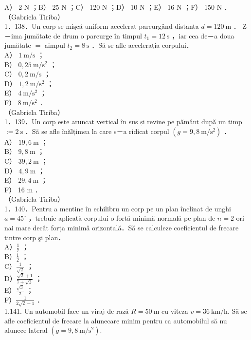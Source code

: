 \documentclass[10pt]{article}
\begin{document}
A） 2 N ；B） 25 N ；C） 120 N ；D） 10 N ；E） 16 N ；F） 150 N ．\\
（Gabriela Tiriba）\\
1．138．Un corp se mişcă uniform accelerat parcurgând distanta $d=120 \mathrm{~m}$ ． Z－ima jumătate de drum o parcurge în timpul $t_{1}=12 \mathrm{~s}$ ，iar cea de－a doua jumătate $=$ aimpul $t_{2}=8 \mathrm{~s}$ ．Să se afle accelerația corpului．\\
A） $1 \mathrm{~m} / \mathrm{s}$ ；\\
B） $0,25 \mathrm{~m} / \mathrm{s}^{2}$ ；\\
C） $0,2 \mathrm{~m} / \mathrm{s}$ ；\\
D） $1,2 \mathrm{~m} / \mathrm{s}^{2}$ ；\\
E） $4 \mathrm{~m} / \mathrm{s}^{2}$ ；\\
F） $8 \mathrm{~m} / \mathrm{s}^{2}$ ．\\
（Gabriela Tiriba）\\
1．139．Un corp este aruncat vertical în sus și revine pe pământ după un timp $:=2 \mathrm{~s}$ ．Sã se afle înălțimea la care s－a ridicat corpul $\left(g=9,8 \mathrm{~m} / \mathrm{s}^{2}\right)$ ．\\
А） $19,6 \mathrm{~m}$ ；\\
B） $9,8 \mathrm{~m}$ ；\\
C） $39,2 \mathrm{~m}$ ；\\
D） $4,9 \mathrm{~m}$ ；\\
E） $29,4 \mathrm{~m}$ ；\\
F） 16 m ．\\
（Gabriela Tiriba）\\
1．140．Pentru a mentine în echilibru un corp pe un plan înclinat de unghi $a=45^{\circ}$ ，trebuie aplicată corpului o fortă minimă normală pe plan de $n=2$ ori nai mare decât forța minimă orizontală．Să se calculeze coeficientul de frecare tintre corp şi plan．\\
A）$\frac{1}{7}$ ；\\
B）$\frac{1}{2}$ ；\\
C）$\frac{1}{\sqrt{2}}$ ；\\
D）$\frac{\sqrt{2}+1}{7+\sqrt{2}}$ ；\\
E）$\frac{\sqrt{3}}{2}$ ；\\
F）$\frac{1}{2 \sqrt{2}-1}$ ．\\
1.141. Un automobil face un viraj de rază $R=50 \mathrm{~m}$ cu viteza $v=36 \mathrm{~km} / \mathrm{h}$. Sã se afle coeficientul de frecare la alunecare minim pentru ca automobilul să nu alunece lateral $\left(g=9,8 \mathrm{~m} / \mathrm{s}^{2}\right)$.\\
\end{document}
